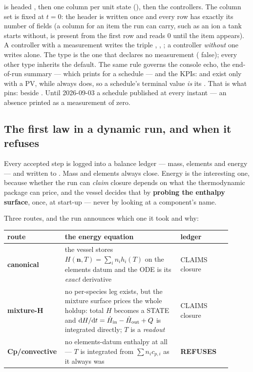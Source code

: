 \documentclass[11pt,a4paper]{article}
\begin{document}
 is headed , then one column per unit state
(), then the controllers.  The column set is fixed at
$t = 0$: the header is written once and every row has exactly its number of
fields (a column for an item the run can carry, such as an ion a tank starts
without, is present from the first row and reads $0$ until the item appears).  A controller with a
measurement writes the triple , ,
; a controller \emph{without} one writes
 alone.  The  type is the one that
declares no measurement ( false); every other type
inherits the default.  The same rule governs the console echo, the
end-of-run summary --- which prints  for a schedule --- and the KPIs:  and
 exist only with a PV, while  always
does, so a schedule's terminal value \emph{is} its .
That is what  pins:
 beside .  Until 2026-09-03
a schedule published  at every instant --- an absence
printed as a measurement of zero.

\subsection{The first law in a dynamic run, and when it refuses}\label{sec:ctrl-energy}

Every accepted step is logged into a balance ledger --- mass, elements and
energy --- and written to .
Mass and elements always close.  Energy is the interesting one, because
whether the run can \emph{claim} closure depends on what the
thermodynamic package can price, and the vessel decides that by
\textbf{probing the enthalpy surface}, once, at start-up --- never by
looking at a component's name.

Three routes, and the run announces which one it took and why:

\begin{center}\small
\begin{tabular}{@{}p{0.19\linewidth}p{0.50\linewidth}p{0.22\linewidth}@{}}
\hline
route & the energy equation & ledger \\
\hline
\textbf{canonical} & the vessel stores $H(\mathbf{n},T) = \sum_i n_i h_i(T)$ on the
elements datum and the ODE is its \emph{exact} derivative & CLAIMS closure \\
\textbf{mixture-H} & no per-species leg exists, but the mixture surface
prices the whole holdup: total $H$ becomes a STATE and
$\mathrm{d}H/\mathrm{d}t = \dot H_{\rm in} - \dot H_{\rm out} + Q$ is
integrated directly; $T$ is a \emph{readout} & CLAIMS closure \\
\textbf{Cp/convective} & no elements-datum enthalpy at all --- $T$ is
integrated from $\sum n_i c_{p,i}$ as it always was & \textbf{REFUSES} \\
\hline
\end{tabular}
\end{center}
\end{document}
